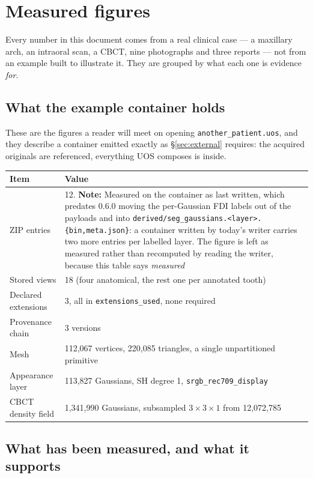 \documentclass[11pt,a4paper]{article}
\newcommand{\code}[1]{\texttt{\small #1}}
\begin{document}
\section{Measured figures}\label{app:figures}

Every number in this document comes from a real clinical case --- a maxillary arch, an
intraoral scan, a CBCT, nine photographs and three reports --- not from an example built
to illustrate it. They are grouped by what each one is evidence \emph{for}.

\subsection*{What the example container holds}

These are the figures a reader will meet on opening \code{another\_patient.uos}, and they
describe a container emitted exactly as \S\ref{sec:external} requires: the acquired
originals are referenced, everything UOS composes is inside.

\begin{longtable}{L{6.2cm} L{9.2cm}}
\toprule
\textbf{Item} & \textbf{Value}\\
\midrule
\endhead
ZIP entries & 12. \textbf{Note:} Measured on the container as last written, which predates 0.6.0
moving the per-Gaussian FDI labels out of the payloads and into
\code{derived/seg\_gaussians.<layer>.\{bin,meta.json\}}: a container written by today's
writer carries two more entries per labelled layer. The figure is left as measured rather
than recomputed by reading the writer, because this table says \emph{measured}\\
Stored views & 18 (four anatomical, the rest one per annotated tooth)\\
Declared extensions & 3, all in \code{extensions\_used}, none required\\
Provenance chain & 3 versions\\
Mesh & 112{,}067 vertices, 220{,}085 triangles, a single unpartitioned primitive\\
Appearance layer & 113{,}827 Gaussians, SH degree 1, \code{srgb\_rec709\_display}\\
CBCT density field & 1{,}341{,}990 Gaussians, subsampled $3\times3\times1$ from
12{,}072{,}785\\
\bottomrule
\end{longtable}

\subsection*{What has been measured, and what it supports}
\end{document}
